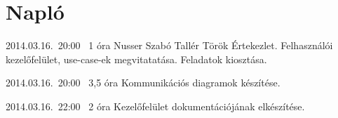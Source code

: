 %
\section{Napló}

\begin{naplo}

\bejegyzes
{2014.03.16.~20:00~} %
{1 óra} %
{Nusser\newline
Szabó\newline
Tallér\newline
Török} %
{Értekezlet. Felhasználói kezelőfelület, use-case-ek megvitatatása. Feladatok kiosztása.} %

\bejegyzes
{2014.03.16.~20:00~}
{3,5 óra}
{\vadam}
{Kommunikációs diagramok készítése.}

\bejegyzes
{2014.03.16.~22:00~}
{2 óra}
{\vbator}
{Kezelőfelület dokumentációjának elkészítése.}

\end{naplo}

